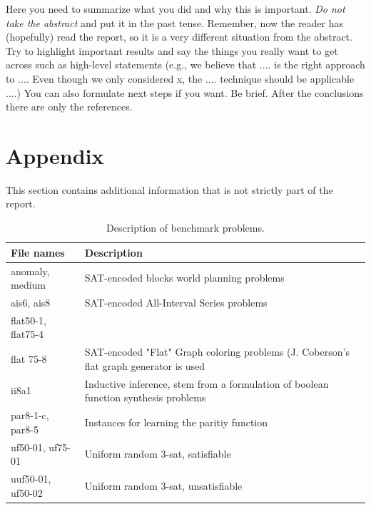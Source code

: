 \documentclass[letterpaper]{article}
\begin{document}
Here you need to summarize what you did and why this is
important. {\em Do not take the abstract} and put it in the past
tense. Remember, now the reader has (hopefully) read the report, so it
is a very different situation from the abstract. Try to highlight
important results and say the things you really want to get across
such as high-level statements (e.g., we believe that .... is the right
approach to .... Even though we only considered x, the
.... technique should be applicable ....) You can also formulate next
steps if you want. Be brief. After the conclusions there are only the references.




\newpage
\section{Appendix}
This section contains additional information that is not strictly part of the report.

\begin{table}[h]
    \centering
    \begin{tabularx}{\columnwidth}{|l|X|}
        \hline
        File names & Description\\
        \hline
        \hline
        anomaly, medium & SAT-encoded blocks world planning problems\\
        \hline
        ais6, ais8 & SAT-encoded All-Interval Series problems\\
        \hline
        flat50-1, flat75-4 \\ flat 75-8 & SAT-encoded "Flat" Graph coloring problems (J. Coberson's flat graph generator is used\\
        \hline
        ii8a1 & Inductive inference, stem from a formulation of boolean function synthesis problems\\
        \hline
        par8-1-c, par8-5 & Instances for learning the paritiy function\\
        \hline
        uf50-01, uf75-01 & Uniform random 3-sat, satisfiable\\
        \hline
        uuf50-01, uf50-02 & Uniform random 3-sat, unsatisfiable\\
        \hline
    \end{tabularx}
    \caption{Description of benchmark problems.}
    \label{tab:benchmark_set}
\end{table}
\end{document}
